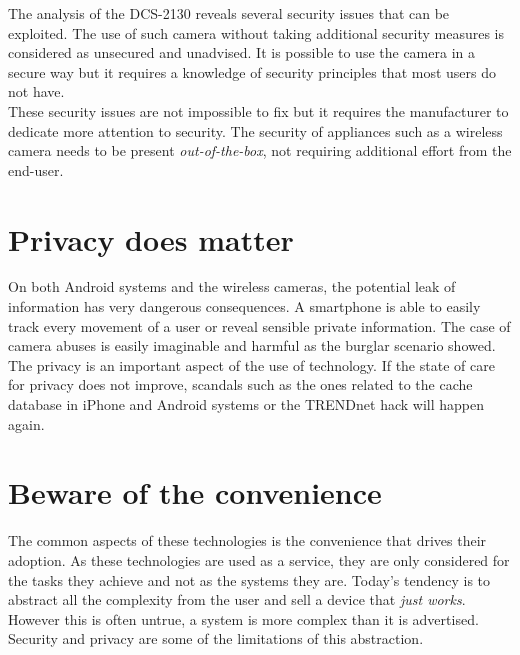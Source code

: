 The analysis of the DCS-2130 reveals several security issues that can be exploited.
The use of such camera without taking additional security measures is considered as unsecured and unadvised.
It is possible to use the camera in a secure way but it requires a knowledge of security principles that most users do not have.\\

These security issues are not impossible to fix but it requires the manufacturer to dedicate more attention to security.
The security of appliances such as a wireless camera needs to be present \emph{out-of-the-box}, not requiring additional effort from the end-user.

\section{Privacy does matter}

On both Android systems and the wireless cameras, the potential leak of information has very dangerous consequences.
A smartphone is able to easily track every movement of a user or reveal sensible private information.
The case of camera abuses is easily imaginable and harmful as the burglar scenario showed.\\

The privacy is an important aspect of the use of technology.
If the state of care for privacy does not improve, scandals such as the ones related to the cache database in iPhone and Android systems or the TRENDnet hack will happen again.

\section{Beware of the convenience}

The common aspects of these technologies is the convenience that drives their adoption.
As these technologies are used as a service, they are only considered for the tasks they achieve and not as the systems they are.
Today's tendency is to abstract all the complexity from the user and sell a device that \emph{just works}.
However this is often untrue, a system is more complex than it is advertised.
Security and privacy are some of the limitations of this abstraction.


